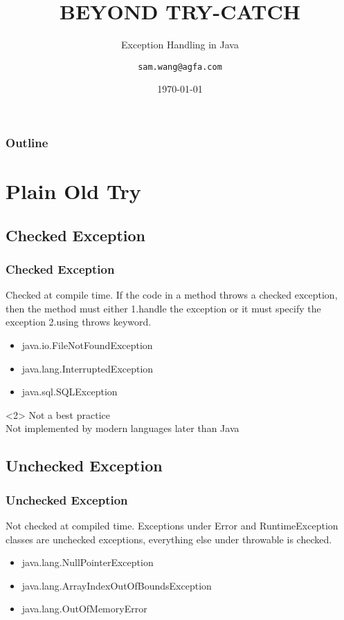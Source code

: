 \documentclass{beamer}
\title{BEYOND TRY-CATCH}
\subtitle{Exception Handling in Java}
\author{\texttt{sam.wang@agfa.com}}
\institute{Shanghai}
\date{\today}
\begin{document}
\begin{frame}
	\titlepage
\end{frame}

\begin{frame}
	\frametitle{Outline}
	\tableofcontents[pausesections]
\end{frame}

\section{Plain Old Try}
\subsection{Checked Exception}
\begin{frame}
  \frametitle{Checked Exception}
  \begin{definition}
    Checked at compile time. If the code in a method throws a checked exception, then the method must either \alert{1.handle the exception} or it must specify the exception \alert{2.using throws} keyword.
  \end{definition}
  \begin{example}
    \begin{itemize}
    \item java.io.FileNotFoundException
    \item java.lang.InterruptedException
    \item java.sql.SQLException
    \end{itemize}
  \end{example}
\begin{uncoverenv}<2>
Not a best practice
\\Not implemented by modern languages later than Java
\end{uncoverenv}
\end{frame}

\subsection{Unchecked Exception}
\begin{frame}
  \frametitle{Unchecked Exception}
  \begin{definition}
    Not checked at compiled time. Exceptions under \alert{Error} and \alert{RuntimeException} classes are unchecked exceptions, everything else under throwable is checked.
  \end{definition}
  \begin{example}
    \begin{itemize}
    \item java.lang.NullPointerException
    \item java.lang.ArrayIndexOutOfBoundsException
    \item java.lang.OutOfMemoryError
    \end{itemize}
  \end{example}
\end{frame}
\end{document}
